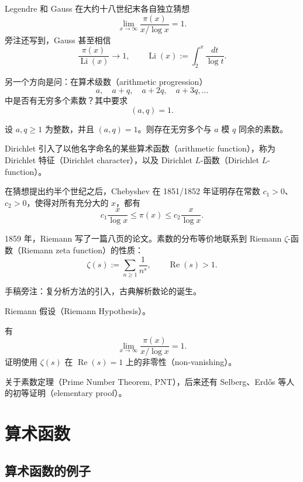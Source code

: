 Legendre 和 Gauss 在大约十八世纪末各自独立猜想
\[
	\lim_{x\to\infty}\frac{\pi(x)}{x/\log x}=1.
\]
旁注还写到，Gauss 甚至相信
\[
	\frac{\pi(x)}{\operatorname{Li}(x)}\longrightarrow 1,
	\qquad
	\operatorname{Li}(x):=\int_2^x\frac{dt}{\log t}.
\]

另一个方向是问：在算术级数（arithmetic progression）
\[
	a,\quad a+q,\quad a+2q,\quad a+3q,\ldots
\]
中是否有无穷多个素数？其中要求
\[
	(a,q)=1.
\]

\begin{theorem}[Dirichlet, 1837]
	设 $a,q\geq 1$ 为整数，并且 $(a,q)=1$。则存在无穷多个与 $a$ 模 $q$ 同余的素数。
\end{theorem}

Dirichlet 引入了以他名字命名的某些算术函数（arithmetic function），称为 Dirichlet 特征（Dirichlet character），以及 Dirichlet $L$-函数（Dirichlet $L$-function）。

在猜想提出约半个世纪之后，Chebyshev 在 1851/1852 年证明存在常数 $c_1>0$、$c_2>0$，使得对所有充分大的 $x$，都有
\[
	c_1\frac{x}{\log x}\leq \pi(x)\leq c_2\frac{x}{\log x}.
\]

1859 年，Riemann 写了一篇八页的论文。素数的分布等价地联系到 Riemann $\zeta$-函数（Riemann zeta function）的性质：
\[
	\zeta(s):=\sum_{n\geq 1}\frac{1}{n^s},\qquad \operatorname{Re}(s)>1.
\]

\begin{remark}
	手稿旁注：复分析方法的引入，古典解析数论的诞生。
\end{remark}

Riemann 假设（Riemann Hypothesis）。

\begin{theorem}
	有
	\[
		\lim_{x\to\infty}\frac{\pi(x)}{x/\log x}=1.
	\]
	证明使用 $\zeta(s)$ 在 $\operatorname{Re}(s)=1$ 上的非零性（non-vanishing）。
\end{theorem}

关于素数定理（Prime Number Theorem, PNT），后来还有 Selberg、Erdős 等人的初等证明（elementary proof）。



\chapter{算术函数}


\section{算术函数的例子}

